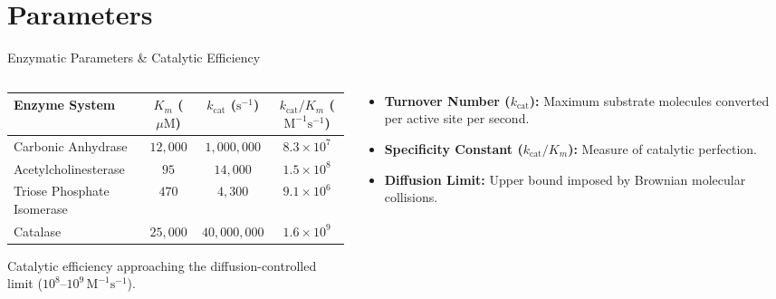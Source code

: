 \documentclass[aspectratio=169, 9pt]{beamer}
\begin{document}
\section{Parameters}
\begin{frame}{Enzymatic Parameters \& Catalytic Efficiency}
    \begin{columns}[c]
        \begin{column}{0.56\textwidth}
            \centering
            \setlength{\tabcolsep}{4.0pt}
            \scriptsize
            \begin{tabular}{@{} l c c c @{}}
                \toprule
                \rowcolor{tableheader}
                \textbf{Enzyme System} & \textbf{$K_m$ ($\mu\mathrm{M}$)} & \textbf{$k_{\mathrm{cat}}$ ($\mathrm{s}^{-1}$)} & \textbf{$k_{\mathrm{cat}}/K_m$ ($\mathrm{M}^{-1}\mathrm{s}^{-1}$)} \\
                \midrule
                Carbonic Anhydrase & $12{,}000$ & $1{,}000{,}000$ & $8.3 \times 10^7$ \\
                Acetylcholinesterase & $95$ & $14{,}000$ & $1.5 \times 10^8$ \\
                Triose Phosphate Isomerase & $470$ & $4{,}300$ & $9.1 \times 10^6$ \\
                Catalase & $25{,}000$ & $40{,}000{,}000$ & $1.6 \times 10^9$ \\
                \bottomrule
            \end{tabular}
            \par\vspace{3pt}
            {\tiny\textcolor{structure!70}{Catalytic efficiency approaching the diffusion-controlled limit ($10^8\text{--}10^9\,\mathrm{M}^{-1}\mathrm{s}^{-1}$).}}
        \end{column}
        \begin{column}{0.42\textwidth}
            \par\vspace{0.3em}
            \scriptsize
            \begin{itemize}\setlength{\itemsep}{2pt}
                \item \textbf{Turnover Number ($k_{\mathrm{cat}}$):} Maximum substrate molecules converted per active site per second.
                \item \textbf{Specificity Constant ($k_{\mathrm{cat}}/K_m$):} Measure of catalytic perfection.
                \item \textbf{Diffusion Limit:} Upper bound imposed by Brownian molecular collisions.
            \end{itemize}
        \end{column}
    \end{columns}
\end{frame}
\end{document}
